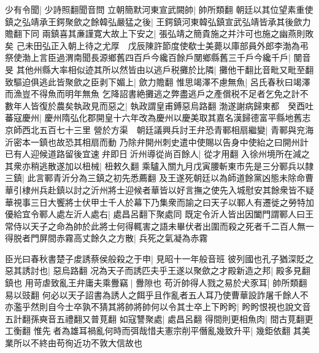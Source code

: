 少有令聞|{
	少詩照翻聞音問}
立朝簡默河東宣武闕帥|{
	帥所類翻}
朝廷以其位望素重使鎮之弘靖承王鍔聚歛之餘韓弘嚴猛之後|{
	王鍔鎮河東韓弘鎮宣武弘靖皆承其後歛力贍翻下同}
兩鎮喜其亷謹寛大故上下安之|{
	張弘靖之簡貴施之并汴可也施之幽燕則敗矣}
己未田弘正入朝上待之尤厚　戊辰陳許節度使欷士美薨以庫部員外郎李渤為弔祭使渤上言臣過渭南聞長源鄉舊四百戶今纔百餘戶閺鄉縣舊三千戶今纔千戶|{
	閺音旻}
其他州縣大率相似迹其所以然皆由以逃戶税攤於比隣|{
	攤他干翻比音毗又毗至翻}
致驅迫俱逃此皆聚歛之臣剥下媚上|{
	歛力贍翻}
惟思竭澤不慮無魚|{
	呂氏春秋曰竭澤而漁豈不得魚而明年無魚}
乞降詔書絶攤逃之弊盡逃戶之產償税不足者乞免之計不數年人皆復於農矣執政見而惡之|{
	執政謂皇甫鎛惡烏路翻}
渤遂謝病歸東都　癸酉吐蕃寇慶州|{
	慶州隋弘化郡開皇十六年改為慶州以慶美取其嘉名漢歸德富平縣地舊志京師西北五百七十三里}
營於方渠　朝廷議興兵討王弁恐青鄆相扇繼變|{
	青鄆與兖海沂密本一鎮也故恐其相扇而動}
乃除弁開州刺史遣中使賜以告身中使紿之曰開州計已有人迎候道路留後宜速弁即日沂州導從尚百餘人|{
	從才用翻}
入徐州境所在減之其衆亦稍逃散遂加以杻械|{
	杻敕久翻}
乘驢入關九月戊寅腰斬東市先是三分鄆兵以隸三鎮|{
	此言鄆青沂分為三鎮之初先悉薦翻}
及王遂死朝廷以為師道餘黨凶態未除命曹華引棣州兵赴鎮以討之沂州將士迎候者華皆以好言撫之使先入城慰安其餘衆皆不疑華視事三日大饗將士伏甲士千人於幕下乃集衆而諭之曰天子以鄆人有遷徙之勞特加優給宜令鄆人處左沂人處右|{
	處昌呂翻下聚處同}
既定令沂人皆出因闔門謂鄆人曰王常侍以天子之命為帥於此將士何得輒害之語未畢伏者出圍而殺之死者千二百人無一得脱者門屏間赤霧高丈餘久之方散|{
	兵死之氣凝為赤霧}


臣光曰春秋書楚子䖍誘蔡侯般殺之于申|{
	見昭十一年般音班}
彼列國也孔子猶深貶之惡其誘討也|{
	惡烏路翻}
况為天子而誘匹夫乎王遂以聚歛之才殿新造之邦|{
	殿多見翻鎮也}
用苛虐致亂王弁庸夫乘釁竊|{
	釁隙也}
苟沂帥得人戮之易於犬豕耳|{
	帥所類翻易以豉翻}
何必以天子詔書為誘人之餌乎且作亂者五人耳乃使曹華設詐屠千餘人不亦濫乎然則自今士卒孰不猜其將帥將帥何以令其士卒上下盻盻|{
	盻盻恨視也說文音五計翻孫奭音五禮翻又普莧翻}
如寇讐聚處|{
	處昌呂翻}
得間則更相魚肉|{
	間古莧翻更工衡翻}
惟先者為雄耳禍亂何時而弭哉惜夫憲宗削平僭亂幾致升平|{
	幾鉅依翻}
其美業所以不終由苟徇近功不敦大信故也

